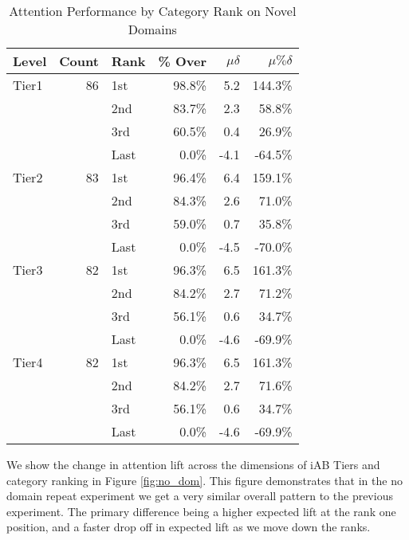 \documentclass[sigconf]{acmart}
\begin{document}
\begin{table}
\caption{Attention Performance by Category Rank on Novel Domains}
\label{tab:nodomainrepeats}
\begin{tabular}{|l|r|l|r|r|r|}
\toprule
Level   &Count  &Rank &\% Over  &$\mu\delta$  &$\mu\%\delta$        \\
\midrule
Tier1   &86       &1st  &98.8\%     &5.2         &144.3\%     \\
        &         &2nd  &83.7\%     &2.3         &58.8\%     \\
        &         &3rd  &60.5\%     &0.4         &26.9\%     \\
        &         &Last &0.0\%      &-4.1        &-64.5\%     \\
Tier2   &83       &1st  &96.4\%     &6.4         &159.1\%     \\
        &         &2nd  &84.3\%     &2.6         &71.0\%     \\
        &         &3rd  &59.0\%     &0.7         &35.8\%     \\
        &         &Last &0.0\%      &-4.5        &-70.0\%     \\
Tier3   &82       &1st  &96.3\%     &6.5         &161.3\%     \\
        &         &2nd  &84.2\%     &2.7         &71.2\%     \\
        &         &3rd  &56.1\%     &0.6         &34.7\%     \\
        &         &Last &0.0\%      &-4.6        &-69.9\%     \\
Tier4   &82       &1st  &96.3\%     &6.5         &161.3\%     \\
        &         &2nd  &84.2\%     &2.7         &71.6\%     \\
        &         &3rd  &56.1\%     &0.6         &34.7\%     \\
        &         &Last &0.0\%      &-4.6        &-69.9\%     \\
\bottomrule
\end{tabular}
\end{table}


We show the change in attention lift across the dimensions of iAB Tiers and category ranking
in Figure \ref{fig:no_dom}. This figure demonstrates that in the no domain repeat experiment
we get a very similar overall pattern to the previous experiment. The primary difference
being a higher expected lift at the rank one position, and a faster drop off in expected
lift as we move down the ranks.
\end{document}
